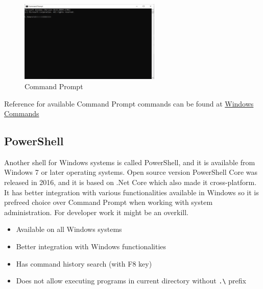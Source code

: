 \begin{figure}[htbp]
    \centering
    \includegraphics[width=0.6\textwidth]{images/command-prompt}
    \caption{Command Prompt\label{fig:Command Prompt}}
\end{figure}

Reference for available Command Prompt commands can be found at \href{https://docs.microsoft.com/en-us/windows-server/administration/windows-commands/windows-commands}{Windows Commands}

\subsection{PowerShell}\label{subsec:powershell}
Another shell for Windows systems is called PowerShell, and it is available from Windows 7 or later operating systems.
Open source version PowerShell Core was released in 2016, and it is based on .Net Core which also made it cross-platform.
It has better integration with various functionalities available in Windows so it is prefreed choice over Command Prompt
when working with system administration.
For developer work it might be an overkill.


\noindent\begin{minipage}[t]{0.5\textwidth}%
    \begin{itemize}[leftmargin=*]
        \item Available on all Windows systems
        \item Better integration with Windows functionalities
        \item Has command history search (with F8 key)
    \end{itemize}
\end{minipage}%
\begin{minipage}[t]{0.5\textwidth}%
    \begin{itemize}[leftmargin=*]
        \item  Does not allow executing programs in
              current directory without  \lstinline{.\} prefix
    \end{itemize}
\end{minipage}%

